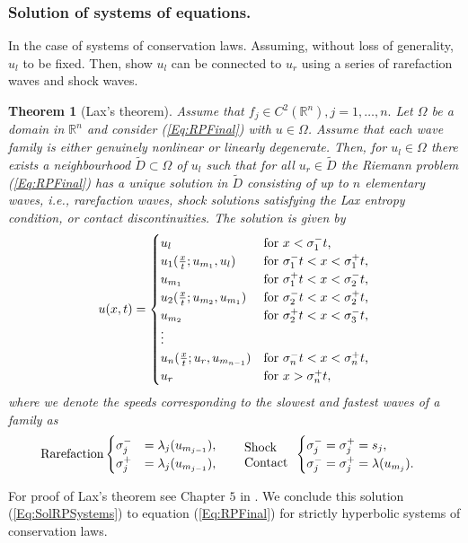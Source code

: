 \documentclass[10pt]{article}
\newtheorem{theorem}{Theorem}[section]
\numberwithin{equation}{section}
\begin{document}
\subsubsection{Solution of systems of equations.} In the case of systems of conservation laws.
Assuming, without loss of generality, $u_l$ to be fixed. Then, show $u_l$ can be connected to $u_r$ using a series of rarefaction waves and shock waves. 
\begin{theorem}[Lax's theorem]
Assume that $f_j \in C^2(\mathbb{R}^n), j = 1, \dots,n. $ Let $\Omega$ be a domain in $\mathbb{R}^n$ and consider (\ref{Eq:RPFinal}) with $u \in \Omega$. Assume that each wave family is either genuinely nonlinear or linearly degenerate. Then, for $u_l \in \Omega$ there exists a neighbourhood $\tilde D \subset \Omega$ of $u_l$ such that for all $u_r \in \tilde D$ the Riemann problem (\ref{Eq:RPFinal}) has a unique solution in $\tilde D$ consisting of up to $n$ elementary waves, i.e., rarefaction waves, shock solutions satisfying the Lax entropy condition, or contact discontinuities. The solution is given by
\begin{align}
    u(x,t) = \begin{cases}
    u_l & \text{for $x < \sigma_1^- t$,} \\
    u_1(\frac{x}{t}; u_{m_1}, u_l) & \text{for $  \sigma_1^- t < x < \sigma_1^+ t$,} \\
    u_{m_1} & \text{for $ \sigma_1^+ t < x < \sigma_2^- t$,} \\
    u_2(\frac{x}{t}; u_{m_2}, u_{m_1}) & \text{for $ \sigma_2^- t < x < \sigma_2^+ t$,} \\
    u_{m_2} & \text{for $ \sigma_2^+ t < x < \sigma_3^- t$,} \\
    \vdots \\
    u_n(\frac{x}{t}; u_r, u_{m_{n-1}}) & \text{for $ \sigma_n^- t < x < \sigma_n^+ t$,} \\
    u_r & \text{for $x > \sigma_n^+ t$,} \\
    \end{cases}
    \label{Eq:SolRPSystems}
\end{align}
where we denote the speeds corresponding to the slowest and fastest waves of a family as
\begin{align*}
    \text{Rarefaction}
    \begin{cases}
    \sigma_j^- &=  \lambda_j(u_{m_{j-1}}), \\
    \sigma_j^+ &=  \lambda_j(u_{m_{j-1}}), 
    \end{cases}
    \quad\quad \parbox{4em}{Shock \\ Contact} \begin{cases}
    \sigma_j^- =  \sigma_j^+ = s_j, \\
    \sigma_j^- =  \sigma_j^+ = \lambda(u_{m_{j}}).
    \end{cases}
\end{align*}
\end{theorem}
For proof of Lax's theorem see Chapter $5$ in \cite{HoldenH.Helge2015Ftfh}.
We conclude this solution (\ref{Eq:SolRPSystems}) to equation (\ref{Eq:RPFinal}) for strictly hyperbolic systems of conservation laws. 
\end{document}
